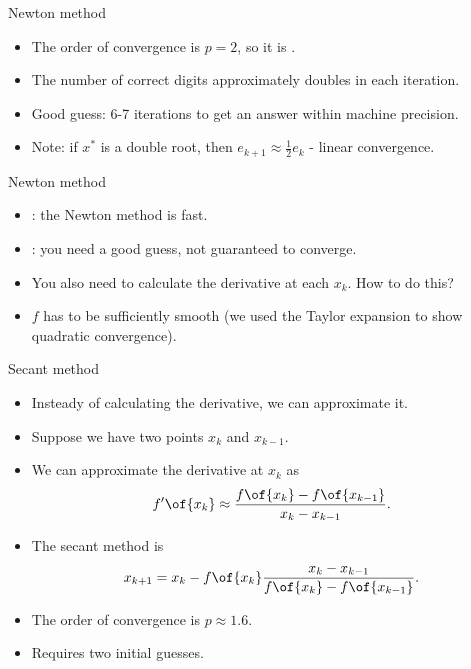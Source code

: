 \documentclass[11pt,xcolor={dvipsnames},aspectratio=159,hyperref={pdftex,pdfpagemode=UseNone,hidelinks,pdfdisplaydoctitle=true},usepdftitle=false]{beamer}
\begin{document}
\begin{frame}{Newton method}
    
    \begin{itemize}
        \item The order of convergence is $p=2$, so it is .
        \item The number of correct digits approximately doubles in each iteration.
        \item Good guess: 6-7 iterations to get an answer within machine precision. 
        \item Note: if $x^*$ is a double root, then $e_{k+1} \approx \frac{1}{2} e_k$ - linear convergence.
\end{itemize}
\end{frame}

\begin{frame}{Newton method}
    
    \begin{itemize}
        \item {}: the Newton method is fast.
        \item {}: you need a good guess, not guaranteed to converge. 
        \item You also need to calculate the derivative at each $x_k$. How to do this? 
        \item $f$ has to be sufficiently smooth (we used the Taylor expansion to show quadratic convergence).
    \end{itemize}
\end{frame}

\begin{frame}{Secant method}
    
    \begin{itemize}
        \item Insteady of calculating the derivative, we can approximate it.
        \item Suppose we have two points $x_k$ and $x_{k-1}$.
        \item We can approximate the derivative at $x_k$ as \begin{align*}
            f'\of{x_k} \approx \frac{f\of{x_k} - f\of{x_{k-1}}}{x_k - x_{k-1}}. \end{align*}
        \item The secant method is \begin{align*}
            x_{k+1} = x_k - f\of{x_k}\frac{x_k - x_{k-1}}{f\of{x_k} - f\of{x_{k-1}}}.
        \end{align*}
        \item The order of convergence is $p\approx 1.6$.
        \item Requires two initial guesses.
    \end{itemize}
\end{frame}
\end{document}
